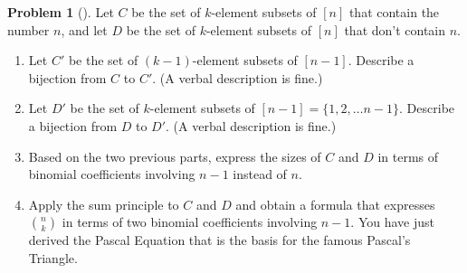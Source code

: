 \documentclass[10pt,]{book}
\theoremstyle{plain}
\theoremstyle{definition}
\newtheorem{activity}[project]{Problem}
\theoremstyle{definition}
\numberwithin{equation}{chapter}
\begin{document}
\begin{activity}[] \label{Pascal}
Let \(C\) be the set of \(k\)-element subsets of \([n]\) that contain the number \(n\), and let \(D\) be the set of \(k\)-element subsets of \([n]\) that don't contain \(n\).%
\begin{enumerate}[font=\bfseries,label=(\alph*),ref=\alph*]
\item\label{task-21} \marginsymbol[-2.5em]{} Let \(C'\) be the set of \((k-1)\)-element subsets of \([n-1]\).  Describe a bijection from \(C\) to \(C'\).  (A verbal description is fine.)%
\item\label{task-22} \marginsymbol[-2.5em]{} Let \(D'\) be the set of \(k\)-element subsets of \([n-1]=\{1,2,\ldots n-1\}\).  Describe a bijection from \(D\) to \(D'\). (A verbal description is fine.)%
\item\label{task-23} \marginsymbol[-2.5em]{} Based on the two previous parts, express the sizes of \(C\) and \(D\) in terms of binomial coefficients involving \(n-1\) instead of \(n\).%
\item\label{task-24} \marginsymbol[-2.5em]{} Apply the sum principle to \(C\) and \(D\) and obtain a formula that expresses \(\binom{n}{k}\) in terms of two binomial coefficients involving \(n-1\).  You have just derived the Pascal Equation that is the basis for the famous Pascal's Triangle.%
\end{enumerate}
\end{activity}
\typeout{************************************************}
\typeout{************************************************}
\end{document}
